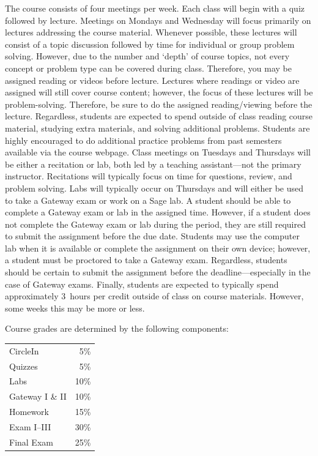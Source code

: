 \documentclass[11pt,letterpaper]{article}
\begin{document}

The course consists of four meetings per week. Each class will begin with a quiz followed by lecture. Meetings on Mondays and Wednesday will focus primarily on lectures addressing the course material. Whenever possible, these lectures will consist of a topic discussion followed by time for individual or group problem solving. However, due to the number and `depth' of course topics, not every concept or problem type can be covered during class. Therefore, you may be assigned reading or videos before lecture. Lectures where readings or video are assigned will still cover course content; however, the focus of these lectures will be problem-solving. Therefore, be sure to do the assigned reading/viewing before the lecture. Regardless, students are expected to spend outside of class reading course material, studying extra materials, and solving additional problems. Students are highly encouraged to do additional practice problems from past semesters available via the course webpage. Class meetings on Tuesdays and Thursdays will be either a recitation or lab, both led by a teaching assistant---not the primary instructor. Recitations will typically focus on time for questions, review, and problem solving. Labs will typically occur on Thursdays and will either be used to take a Gateway exam or work on a Sage lab. A student should be able to complete a Gateway exam or lab in the assigned time. However, if a student does not complete the Gateway exam or lab during the period, they are still required to submit the assignment before the due date. Students may use the computer lab when it is available or complete the assignment on their own device; however, a student must be proctored to take a Gateway exam. Regardless, students should be certain to submit the assignment before the deadline---especially in the case of Gateway exams. Finally, students are expected to typically spend approximately 3~hours per credit outside of class on course materials. However, some weeks this may be more or less. 
\sectionbreak








Course grades are determined by the following components: \par
	\begin{table}[!ht]
        \begin{tabular}{lr}
	CircleIn & 5\% \\
	Quizzes & 5\% \\
	Labs & 10\% \\
	Gateway I \& II & 10\% \\
	Homework & 15\% \\
	Exam I--III & 30\% \\
	Final Exam & 25\%
        \end{tabular} 
        \end{table}
\sectionbreak
\end{document}
